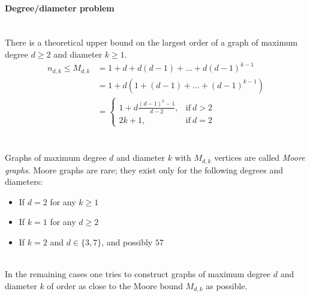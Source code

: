\documentclass[portrait,a0,final]{a0poster}
\begin{document}
\begin{multicols}{3}
\paragraph{Degree/diameter problem}
~\\
There is a theoretical upper bound on the largest order of a graph of maximum degree $d\ge 2$ and diameter $k\ge 1$.
\begin{equation}\label{eq:Moore}
	\begin{split}
		n_{d,k} \leq M_{d,k}    & = 1 + d + d(d - 1) + \dots + d(d - 1)^{k-1}  \\
								& = 1 + d(1 + (d - 1) + \dots + (d - 1)^{k-1}) \\
								& = \begin{cases}
								1+d\frac{(d-1)^{k}-1}{d-2}, & \text{if}\ d > 2 \\
								2k+1, & \text{if}\ d=2
									\end{cases}
	\end{split}
\end{equation} ~\\~\\
Graphs of maximum degree $d$ and diameter $k$ with $M_{d,k}$ vertices are called {\em Moore graphs}. Moore graphs are rare; they exist only for the following degrees and diameters: 
~\\
\begin{itemize}
	\item If $d = 2$ for any $k \geq 1$
	\item If $k = 1$ for any $d \geq 2$
	\item If $k = 2$ and $d \in \{3, 7 \}$, and possibly $57$
\end{itemize} ~\\
In the remaining cases one tries to construct graphs of maximum degree $d$ and diameter $k$ of order as close to the Moore bound $M_{d,k}$ as possible.


\end{multicols}
\end{document}
